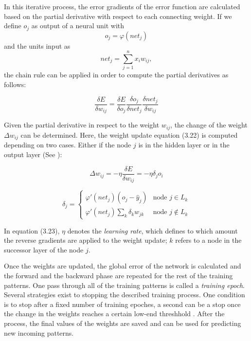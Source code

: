 In this iterative process, the error gradients of the error function are calculated based on the partial derivative with respect to each connecting weight. If we define $o_j$ as output of a neural unit with
\begin{equation}
  o_j = \varphi(net_j)
\end{equation}
and the units input as
\begin{equation}
  net_j = \sum_{j=1}^{n}x_{i}w_{ij},
\end{equation}
the chain rule can be applied in order to compute the partial derivatives as follows:

\begin{equation}
  \frac{\delta E}{\delta w_{ij}} = \frac{\delta E}{\delta o_j} \frac{\delta o_j}{\delta net_j} \frac{\delta net_j}{\delta w_{ij}}
\end{equation}

Given the partial derivative in respect to the weight $w_{ij}$, the change of the weight $\Delta w_{ij}$ can be determined. Here, the weight update equation (3.22) is computed depending on two cases. Either if the node $j$ is in the hidden layer or in the output layer (See \cite{Mitchell:1997:ML:541177}):

\begin{equation}
  \Delta w_{ij} = -\eta \frac{\delta E}{\delta w_{ij}} = - \eta \delta_j o_i
\end{equation}

\begin{equation}
  \delta_j =
  \begin{cases}
    \varphi'(net_j)(o_j - \hat{y}_j) & \text{node $j \in L_k$}\\
    \varphi'(net_j) \sum_k \delta_k w_{jk} & \text{node $j \notin L_k$}
  \end{cases}
\end{equation}

In equation (3.23), $\eta$ denotes the \textit{learning rate}, which defines to which amount the reverse gradients are applied to the weight update; $k$ refers to a node in the successor layer of the node $j$.

Once the weights are updated, the global error of the network is calculated and the forward and the backward phase are repeated for the rest of the training patterns. One pass through all of the training patterns is called a \textit{training epoch}. Several strategies exist to stopping the described training process. One condition is to stop after a fixed number of training epoches, a second can be a stop once the change in the weights reaches a certain low-end threshhold \cite{Haykin:1998:NNC:521706}. After the process, the final values of the weights are saved and can be used for predicting new incoming patterns.

